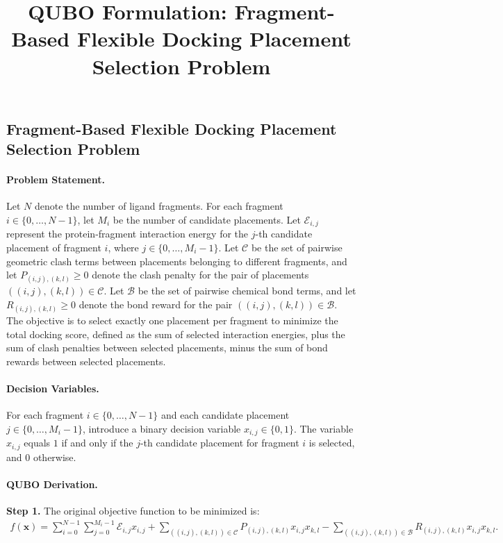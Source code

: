 \documentclass[12pt]{article}
\title{QUBO Formulation: Fragment-Based Flexible Docking Placement Selection Problem}
\date{}
\begin{document}
\maketitle

\subsection*{Fragment-Based Flexible Docking Placement Selection Problem}

\paragraph{Problem Statement.}
Let $N$ denote the number of ligand fragments. For each fragment $i \in \{0, \dots, N-1\}$, let $M_i$ be the number of candidate placements. Let $\mathcal{E}_{i,j}$ represent the protein-fragment interaction energy for the $j$-th candidate placement of fragment $i$, where $j \in \{0, \dots, M_i-1\}$. Let $\mathcal{C}$ be the set of pairwise geometric clash terms between placements belonging to different fragments, and let $P_{(i,j),(k,l)} \ge 0$ denote the clash penalty for the pair of placements $((i,j), (k,l)) \in \mathcal{C}$. Let $\mathcal{B}$ be the set of pairwise chemical bond terms, and let $R_{(i,j),(k,l)} \ge 0$ denote the bond reward for the pair $((i,j), (k,l)) \in \mathcal{B}$. The objective is to select exactly one placement per fragment to minimize the total docking score, defined as the sum of selected interaction energies, plus the sum of clash penalties between selected placements, minus the sum of bond rewards between selected placements.

\paragraph{Decision Variables.}
For each fragment $i \in \{0, \dots, N-1\}$ and each candidate placement $j \in \{0, \dots, M_i-1\}$, introduce a binary decision variable $x_{i,j} \in \{0,1\}$. The variable $x_{i,j}$ equals $1$ if and only if the $j$-th candidate placement for fragment $i$ is selected, and $0$ otherwise.

\paragraph{QUBO Derivation.}
\textbf{Step 1.} The original objective function to be minimized is:
\begin{align}
  f(\mathbf{x}) = \sum_{i=0}^{N-1} \sum_{j=0}^{M_i-1} \mathcal{E}_{i,j} x_{i,j} + \sum_{((i,j),(k,l)) \in \mathcal{C}} P_{(i,j),(k,l)} x_{i,j} x_{k,l} - \sum_{((i,j),(k,l)) \in \mathcal{B}} R_{(i,j),(k,l)} x_{i,j} x_{k,l}.
\end{align}
\end{document}
